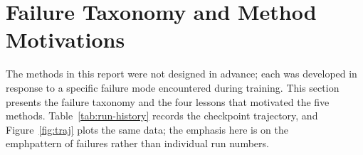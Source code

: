 \documentclass[11pt]{article}
\begin{document}
\section{Failure Taxonomy and Method Motivations}
\label{sec:runs}
\label{sec:lessons}

The methods in this report were not designed in advance; each was
developed in response to a specific failure mode encountered during
training. This section presents the failure taxonomy and the four
lessons that motivated the five methods. Table~\ref{tab:run-history}
records the checkpoint trajectory, and Figure~\ref{fig:traj} plots the
same data; the emphasis here is on the \\emph{pattern} of failures
rather than individual run numbers.
\end{document}
